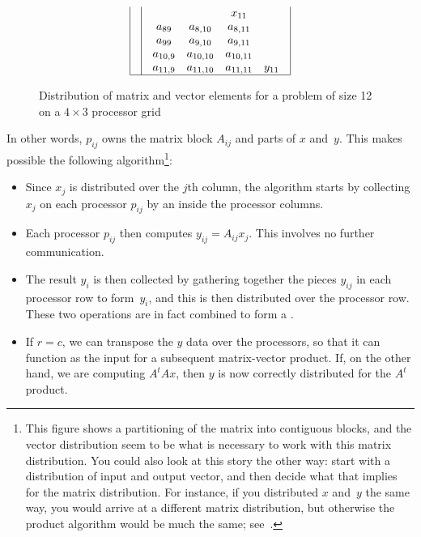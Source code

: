 \begin{figure}[ht]
{\[\begin{array}{| c | c | c | c |}
&
\begin{array}{c c c c}
&&x_{11}\\
a_{89} &   a_{8,10} &  a_{8,11} & \\
a_{99} &   a_{9,10} &  a_{9,11} & \\
a_{10,9} & a_{10,10} & a_{10,11} & \\
a_{11,9} & a_{11,10} & a_{11,11} & y_{11} \\
\end{array}
\\ \hline
\end{array}
\]
}
\caption{Distribution of matrix and vector elements for a problem of size 12 on a $4\times 3$ processor grid}
\label{fig:2dmatrix}
\end{figure}

In other words, $ p_{ij} $ owns the matrix block $A_{ij}$
and parts of $x$ and~$y$. This makes possible the following algorithm\footnote
{This figure shows a partitioning of the matrix into contiguous blocks,
and the vector distribution seem to be what is necessary to work with this 
matrix distribution. You could also look at this story the other way:
start with a distribution of input and output vector, and then decide what
that implies for the matrix distribution. For instance, if you distributed
$x$ and~$y$ the same way, you would arrive at a different matrix distribution,
but otherwise the product algorithm would be much the same; see~\cite{Flame:PBMD-report}.}:
\begin{itemize}
\item Since $x_j$ is distributed over the $j$th column, the algorithm starts
  by collecting $x_j$ on each processor $p_{ij}$ by an
   inside the processor columns.
\item Each processor $p_{ij}$ then computes $y_{ij} = A_{ij}x_j$. This
  involves no further communication.
\item The result $y_i$ is then collected by gathering together the
  pieces $y_{ij}$ in each processor row to form~$y_i$, and this is then
  distributed over the processor row. These two operations are in fact
  combined to form a .
\item If $r=c$, we can transpose the $y$ data over the processors, so
  that it can function as the input for a subsequent matrix-vector
  product. If, on the other hand, we are computing $A^tAx$, then $y$
  is now correctly distributed for the $A^t$ product.
\end{itemize}


